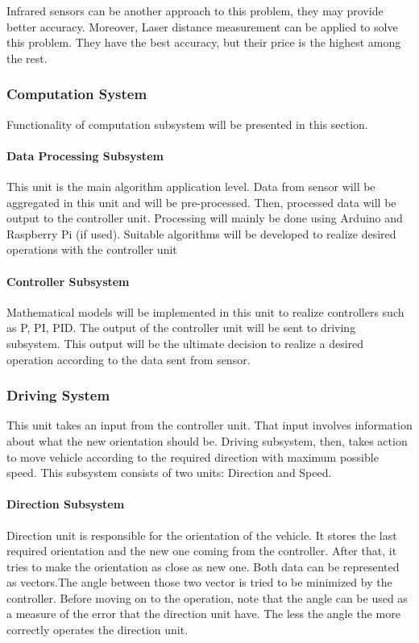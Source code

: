 \documentclass[a4paper,12pt]{article}
\begin{document}
Infrared sensors can be another approach to this problem, they may provide better accuracy. Moreover, Laser distance measurement can be applied to solve this problem. They have the best accuracy, but their price is the highest among the rest.

	\subsubsection{Computation System}
		Functionality of computation subsystem will be presented in this section.
	
		\paragraph{Data Processing Subsystem}
		This unit is the main algorithm application level. Data from sensor will be aggregated in this unit and will be pre-processed. Then, processed data will be output to the controller unit. Processing will mainly be done using Arduino and Raspberry Pi (if used). Suitable algorithms will be developed to realize desired operations with the controller unit

		\paragraph{Controller Subsystem}
			Mathematical models will be implemented in this unit to realize controllers such as P, PI, PID. The output of the controller unit will be sent to driving subsystem. This output will be the ultimate decision to realize a desired operation according to the data sent from sensor.

	\subsubsection{Driving System}
		This unit takes an input from the controller unit. That input involves information about what the new orientation should be. Driving subsystem, then, takes action to move vehicle according to the required direction with maximum possible speed. This subsystem consists of two units: Direction and Speed.

		\paragraph{Direction Subsystem}
			Direction unit is responsible for the orientation of the vehicle. It stores the last required orientation and the new one coming from the controller. After that, it tries to make the orientation as close as new one. Both data can be represented as vectors.The angle between those two vector is tried to be minimized by the controller. Before moving on to the operation, note that the angle can be used as a measure of the error that the direction unit have. The less the angle the more correctly operates the direction unit.\\
\end{document}
